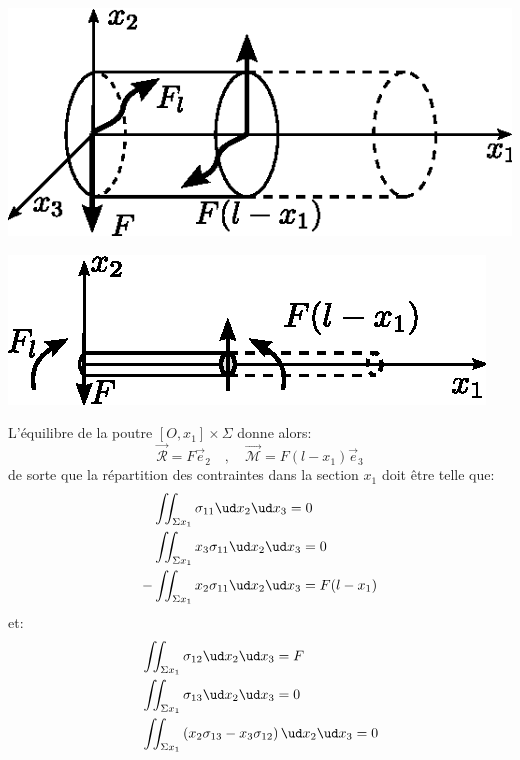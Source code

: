 \begin{multicols}{2}
    \begin{center}
        \includegraphics{../images/T1_Ch07-19a}
    \end{center}
    \columnbreak
    \begin{center}
        \includegraphics{../images/T1_Ch07-19b}
    \end{center}
\end{multicols}
L'équilibre de la poutre $[O,x_1]\times \Sigma$ donne alors:
\begin{displaymath}
    \vec{\mathcal{R}} = F \vec{e}_2 \quad,\quad \vec{\mathcal{M}} = F (l -x_1) \vec{e}_3
\end{displaymath}
de sorte que la répartition des contraintes dans la section $x_1$ doit être telle que:
\begin{equation}
    \begin{aligned}
       & \iint_{\Sigma x_1} \sigma_{11} \ud x_2 \ud x_3 = 0 \\
       & \iint_{\Sigma x_1} x_3\sigma_{11} \ud x_2 \ud x_3 = 0 \\
        -&\iint_{\Sigma x_1} x_2\sigma_{11} \ud x_2 \ud x_3 = F (l-x_1)
    \end{aligned}
    \label{eq:Ch07-092}
\end{equation}
et:
\begin{subequations}
\begin{align}
    &\iint_{\Sigma x_1} \sigma_{12} \ud x_2 \ud x_3 = F
    \label{eq:Ch07-093}\\
    &\iint_{\Sigma x_1} \sigma_{13} \ud x_2 \ud x_3 = 0
    \label{eq:Ch07-094}\\
    &\iint_{\Sigma x_1} \left( x_2\sigma_{13} - x_3 \sigma_{12} \right) \ud x_2 \ud x_3 = 0
    \label{eq:Ch07-095}
\end{align}
\end{subequations}
